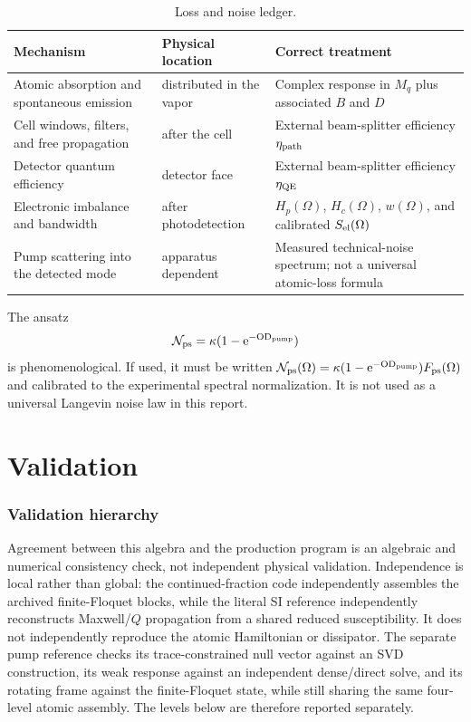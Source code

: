 \documentclass[11pt,a4paper]{article}
\newcommand{\e}{\mathrm e}
\begin{document}
\begin{table}[ht]
\centering
\caption{Loss and noise ledger.}
\label{tab:loss-ledger}
\small
\begin{tabularx}{\textwidth}{L{3.4cm}L{3.2cm}Y}
\toprule
Mechanism & Physical location & Correct treatment\\
\midrule
Atomic absorption and spontaneous emission & distributed in the vapor &
Complex response in $M_q$ plus associated $B$ and $D$\\
Cell windows, filters, and free propagation & after the cell &
External beam-splitter efficiency $\eta_{\rm path}$\\
Detector quantum efficiency & detector face &
External beam-splitter efficiency $\eta_{\rm QE}$\\
Electronic imbalance and bandwidth & after photodetection &
$H_p(\Omega)$, $H_c(\Omega)$, $w(\Omega)$, and calibrated
$S_{\rm el}(\Omega)$\\
Pump scattering into the detected mode & apparatus dependent &
Measured technical-noise spectrum; not a universal atomic-loss formula\\
\bottomrule
\end{tabularx}
\end{table}

The ansatz
\[
\mathcal N_{\rm ps}=\kappa(1-\e^{-{\rm OD}_{\rm pump}})
\]
is phenomenological. If used, it must be written
$\mathcal N_{\rm ps}(\Omega)=
\kappa(1-\e^{-{\rm OD}_{\rm pump}})F_{\rm ps}(\Omega)$ and calibrated to the
experimental spectral normalization. It is not used as a universal Langevin
noise law in this report.

\part{Validation}

\section{Validation hierarchy}

Agreement between this algebra and the production program is an algebraic and
numerical consistency check, not independent physical validation. Independence
is local rather than global: the continued-fraction code independently assembles
the archived finite-Floquet blocks, while the literal SI reference independently
reconstructs Maxwell/$Q$ propagation from a shared reduced susceptibility. It
does not independently reproduce the atomic Hamiltonian or dissipator. The
separate pump reference checks its trace-constrained null vector against an SVD
construction, its weak response against an independent dense/direct solve, and
its rotating frame against the finite-Floquet state, while still sharing the
same four-level atomic assembly. The levels below are therefore reported
separately.
\end{document}
